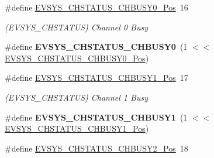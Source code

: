 \begin{DoxyCompactItemize}
\item 
\hypertarget{group___s_a_m_l21___e_v_s_y_s_ga9a10f270ab54c11a0b74eddf263dd36b}{}\#define \hyperlink{group___s_a_m_l21___e_v_s_y_s_ga9a10f270ab54c11a0b74eddf263dd36b}{E\+V\+S\+Y\+S\+\_\+\+C\+H\+S\+T\+A\+T\+U\+S\+\_\+\+C\+H\+B\+U\+S\+Y0\+\_\+\+Pos}~16\label{group___s_a_m_l21___e_v_s_y_s_ga9a10f270ab54c11a0b74eddf263dd36b}

\begin{DoxyCompactList}\small\item\em (E\+V\+S\+Y\+S\+\_\+\+C\+H\+S\+T\+A\+T\+U\+S) Channel 0 Busy \end{DoxyCompactList}\item 
\hypertarget{group___s_a_m_l21___e_v_s_y_s_gac40089b08c0ecca849d9125b1461b6e3}{}\#define {\bfseries E\+V\+S\+Y\+S\+\_\+\+C\+H\+S\+T\+A\+T\+U\+S\+\_\+\+C\+H\+B\+U\+S\+Y0}~(1 $<$$<$ \hyperlink{group___s_a_m_l21___e_v_s_y_s_ga9a10f270ab54c11a0b74eddf263dd36b}{E\+V\+S\+Y\+S\+\_\+\+C\+H\+S\+T\+A\+T\+U\+S\+\_\+\+C\+H\+B\+U\+S\+Y0\+\_\+\+Pos})\label{group___s_a_m_l21___e_v_s_y_s_gac40089b08c0ecca849d9125b1461b6e3}

\item 
\hypertarget{group___s_a_m_l21___e_v_s_y_s_ga525f1cce8f409918f0229ecccfde8d8b}{}\#define \hyperlink{group___s_a_m_l21___e_v_s_y_s_ga525f1cce8f409918f0229ecccfde8d8b}{E\+V\+S\+Y\+S\+\_\+\+C\+H\+S\+T\+A\+T\+U\+S\+\_\+\+C\+H\+B\+U\+S\+Y1\+\_\+\+Pos}~17\label{group___s_a_m_l21___e_v_s_y_s_ga525f1cce8f409918f0229ecccfde8d8b}

\begin{DoxyCompactList}\small\item\em (E\+V\+S\+Y\+S\+\_\+\+C\+H\+S\+T\+A\+T\+U\+S) Channel 1 Busy \end{DoxyCompactList}\item 
\hypertarget{group___s_a_m_l21___e_v_s_y_s_ga75146bbc4e756d478c73b82f301b1065}{}\#define {\bfseries E\+V\+S\+Y\+S\+\_\+\+C\+H\+S\+T\+A\+T\+U\+S\+\_\+\+C\+H\+B\+U\+S\+Y1}~(1 $<$$<$ \hyperlink{group___s_a_m_l21___e_v_s_y_s_ga525f1cce8f409918f0229ecccfde8d8b}{E\+V\+S\+Y\+S\+\_\+\+C\+H\+S\+T\+A\+T\+U\+S\+\_\+\+C\+H\+B\+U\+S\+Y1\+\_\+\+Pos})\label{group___s_a_m_l21___e_v_s_y_s_ga75146bbc4e756d478c73b82f301b1065}

\item 
\hypertarget{group___s_a_m_l21___e_v_s_y_s_gaf6e013b29b4cdd509eeac812ddaac8db}{}\#define \hyperlink{group___s_a_m_l21___e_v_s_y_s_gaf6e013b29b4cdd509eeac812ddaac8db}{E\+V\+S\+Y\+S\+\_\+\+C\+H\+S\+T\+A\+T\+U\+S\+\_\+\+C\+H\+B\+U\+S\+Y2\+\_\+\+Pos}~18\label{group___s_a_m_l21___e_v_s_y_s_gaf6e013b29b4cdd509eeac812ddaac8db}


\end{DoxyCompactItemize}
